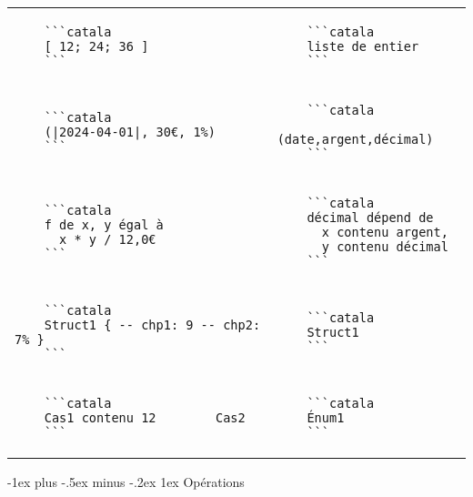 \documentclass{article}
\makeatletter
\newcommand\articlenormalsize{\fontsize{10pt}{12pt}\selectfont}
\renewcommand{\section}{\@startsection{section}{1}{0mm}%
                                {-1ex plus -.5ex minus -.2ex}%
                                {1ex}%
                                {\normalfont\articlenormalsize\bfseries}}
\newenvironment{catala}{%
  \VerbatimEnvironment
  \let\FV@ListVSpace\relax
  \begin{verbatim}}%
 {\end{verbatim}}
\makeatother
\begin{document}
\begin{multicols}{3}
\begin{tabular}{@{}p{\cola}p{\colb}@{}}
\begin{catala}
    ```catala
    [ 12; 24; 36 ]
    ```
  \end{catala}
  & \begin{catala}
    ```catala
    liste de entier
    ```
  \end{catala}
  \\
  \begin{catala}
    ```catala
    (|2024-04-01|, 30€, 1%
    ```
  \end{catala}
  & \begin{catala}
    ```catala
    (date,argent,décimal)
    ```
  \end{catala}
  \\
  \begin{catala}
    ```catala
    f de x, y égal à
      x * y / 12,0€
    ```
  \end{catala}
  & \begin{catala}
    ```catala
    décimal dépend de
      x contenu argent,
      y contenu décimal
    ```
  \end{catala}

  \\

  \begin{catala}
    ```catala
    Struct1 { -- chp1: 9 -- chp2: 7%
    ```
  \end{catala}
  & \begin{catala}
    ```catala
    Struct1
    ```
  \end{catala}

  \\

  \begin{catala}
    ```catala
    Cas1 contenu 12        Cas2
    ```
  \end{catala}
  & \begin{catala}
    ```catala
    Énum1
    ```
  \end{catala}
  \\
\end{tabular}

\vspace{-5pt}

\section{Opérations}


\end{multicols}
\end{document}
